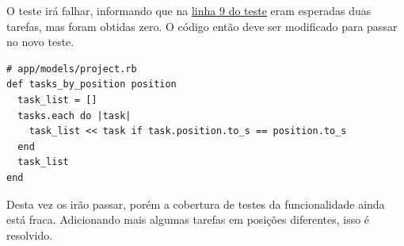 O teste irá falhar, informando que na \hyperref[code:tdd_spec1]{linha 9 do teste} eram esperadas duas tarefas, mas foram obtidas zero. O código então deve ser modificado para passar no novo teste.

\begin{lstlisting}[caption=Código do método Project\#tasks\_by\_position (versão 2),label=code:tdd_code2]
# app/models/project.rb
def tasks_by_position position
  task_list = []
  tasks.each do |task|
    task_list << task if task.position.to_s == position.to_s
  end
  task_list
end
\end{lstlisting}

Desta vez os irão passar, porém a cobertura de testes da funcionalidade ainda está fraca. Adicionando mais algumas tarefas em posições diferentes, isso é resolvido.






